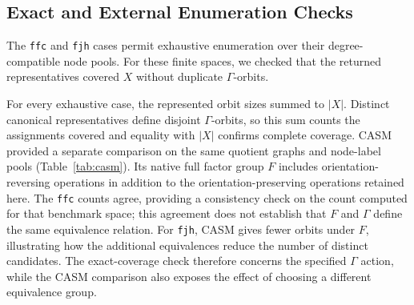 \documentclass[a5paper, 10pt]{article}
\begin{document}
\subsection{Exact and External Enumeration Checks}

The \texttt{ffc} and \texttt{fjh} cases permit exhaustive enumeration over their degree-compatible node pools. For these finite spaces, we checked that the returned representatives covered $X$ without duplicate $\Gamma$-orbits.

For every exhaustive case, the represented orbit sizes summed to $|X|$. Distinct canonical representatives define disjoint $\Gamma$-orbits, so this sum counts the assignments covered and equality with $|X|$ confirms complete coverage. CASM provided a separate comparison on the same quotient graphs and node-label pools (Table~\ref{tab:casm}). %
Its native full factor group $F$ includes orientation-reversing operations in addition to the orientation-preserving operations retained here. The \texttt{ffc} counts agree, providing a consistency check on the count computed for that benchmark space; this agreement does not establish that $F$ and $\Gamma$ define the same equivalence relation. For \texttt{fjh}, CASM gives fewer orbits under $F$, illustrating how the additional equivalences reduce the number of distinct candidates. The exact-coverage check therefore concerns the specified $\Gamma$ action, while the CASM comparison also exposes the effect of choosing a different equivalence group.
\end{document}
